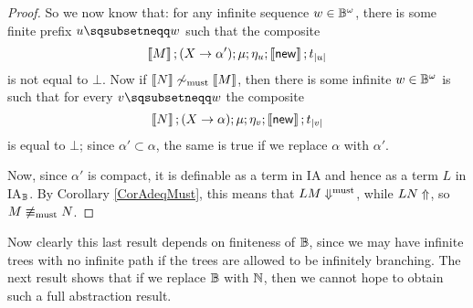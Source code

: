 \documentclass[11pt]{report}
\begin{document}
\begin{proof}
  So we now know that: for any infinite sequence $w\in \mathbb{B}^\omega$, there is some finite prefix $u\pprefix w$ such that the composite
  \[
    \left\llbracket M\right\rrbracket;(X \to \alpha');\mu;\eta_u;\left\llbracket\operatorname{{\mathsf{new}}}\right\rrbracket;t_{|u|}
    \]
  is not equal to $\bot$.  
  Now if $\left\llbracket N\right\rrbracket\not\sim_{\operatorname{must}}\left\llbracket M\right\rrbracket$, then there is some infinite $w\in \mathbb{B}^\omega$ is such that for every $v\pprefix w$ the composite
  \[
    \left\llbracket N\right\rrbracket;(X \to \alpha);\mu;\eta_v;\left\llbracket\operatorname{{\mathsf{new}}}\right\rrbracket;t_{|v|}
    \]
  is equal to $\bot$; since $\alpha'\subset \alpha$, the same is true if we replace $\alpha$ with $\alpha'$.

  Now, since $\alpha'$ is compact, it is definable as a term in IA and hence as a term $L$ in IA${}_{\mathbb{B}}$.  
  By Corollary \ref{CorAdeqMust}, this means that $L M \Downarrow^{\text{must}}$, while $L N\Uparrow$, so $M\not\equiv_{\operatorname{must}}N$.
\end{proof}

Now clearly this last result depends on finiteness of $\mathbb{B}$, since we may have infinite trees with no infinite path if the trees are allowed to be infinitely branching.
The next result shows that if we replace $\mathbb{B}$ with $\mathbb{N}$, then we cannot hope to obtain such a full abstraction result.
\end{document}
